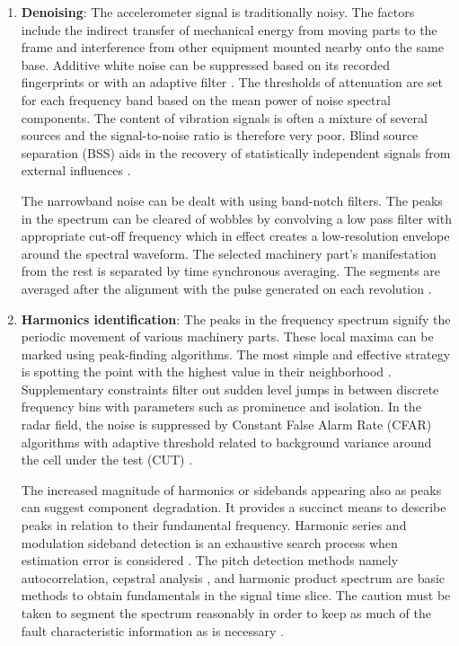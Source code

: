 \documentclass[11pt, a4paper, english]{article}
\begin{document}
\begin{refsection}
\begin{enumerate}
	\item \textbf{Denoising}: The accelerometer signal is traditionally noisy. The factors include the indirect transfer of mechanical energy from moving parts to the frame and interference from other equipment mounted nearby onto the same base. Additive white noise can be suppressed based on its recorded fingerprints or with an adaptive filter \cite{nandi_condition_2019}. The thresholds of attenuation are set for each frequency band based on the mean power of noise spectral components. The content of vibration signals is often a mixture of several sources and the signal-to-noise ratio is therefore very poor. Blind source separation (BSS) aids in the recovery of statistically independent signals from external influences \cite{nandi_condition_2019}. 
	
	The narrowband noise can be dealt with using band-notch filters. The peaks in the spectrum can be cleared of wobbles by convolving a low pass filter with appropriate cut-off frequency which in effect creates a low-resolution envelope around the spectral waveform. The selected machinery part's manifestation from the rest is separated by time synchronous averaging. The segments are averaged after the alignment with the pulse generated on each revolution \cite{bechhoefer_review_2009}.
	
	\item \textbf{Harmonics identification}: The peaks in the frequency spectrum signify the periodic movement of various machinery parts. These local maxima can be marked using peak-finding algorithms. The most simple and effective strategy is spotting the point with the highest value in their neighborhood \cite{adikaram_non-parametric_2016}. Supplementary constraints filter out sudden level jumps in between discrete frequency bins with parameters such as prominence and isolation. In the radar field, the noise is suppressed by Constant False Alarm Rate (CFAR) algorithms with adaptive threshold related to background variance around the cell under the test (CUT) \cite{hatem_comparative_2018}.
	
	 The increased magnitude of harmonics or sidebands appearing also as peaks can suggest component degradation. It provides a succinct means to describe peaks in relation to their fundamental frequency. Harmonic series and modulation sideband detection is an exhaustive search process when estimation error is considered \cite{gerber_identification_2013}. The pitch detection methods namely autocorrelation, cepstral analysis \cite{rabiner_introduction_2007}, and harmonic product spectrum are basic methods to obtain fundamentals in the signal time slice. The caution must be taken to segment the spectrum reasonably in order to keep as much of the fault characteristic information as is necessary \cite{yonggang_time_2020}.
\end{enumerate}


\end{refsection}
\end{document}
